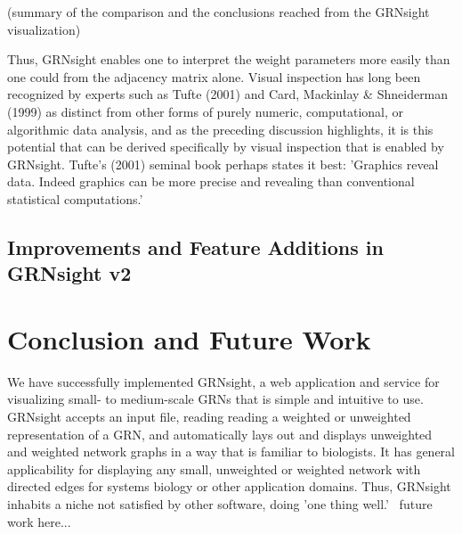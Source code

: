 \documentclass[sigconf,review,anonymous]{acmart}
\begin{document}
(summary of the comparison and the conclusions reached from the GRNsight visualization)

Thus, GRNsight enables one to interpret the weight parameters more easily than one could from the adjacency matrix alone. Visual inspection has long been recognized by experts such as Tufte (2001) and Card, Mackinlay & Shneiderman (1999) as distinct from other forms of purely numeric, computational, or algorithmic data analysis, and as the preceding discussion highlights, it is this potential that can be derived specifically by visual inspection that is enabled by GRNsight. Tufte's (2001) seminal book perhaps states it best: 'Graphics reveal data. Indeed graphics can be more precise and revealing than conventional statistical computations.'

\subsection{Improvements and Feature Additions in GRNsight v2}


\section{Conclusion and Future Work}
We have successfully implemented GRNsight, a web application and service for visualizing small- to medium-scale GRNs that is simple and intuitive to use. GRNsight accepts an input file, reading reading a weighted or unweighted representation of a GRN, and automatically lays out and displays unweighted and weighted network graphs in a way that is familiar to biologists. It has general applicability for displaying any small, unweighted or weighted network with directed edges for systems biology or other application domains. Thus, GRNsight inhabits a niche not satisfied by other software, doing 'one thing well.'
~future work here...~


 
\end{document}
